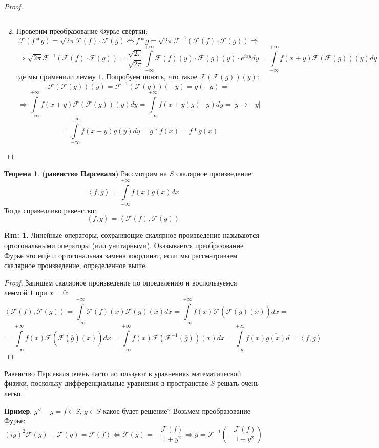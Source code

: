 \documentclass[12pt]{article}
\theoremstyle{definition}
\newtheorem{rem}{Rm:}
\newtheorem{theorem}{Теорема}
\newcommand{\ddint}[2]{\displaystyle\int\limits_{#1}^{#2}}
\newcommand{\inner}[2]{\left\langle #1, #2 \right\rangle }
\newcommand{\fourt}[1]{\mathcal{F}\left(#1\right)}
\newcommand{\ifourt}[1]{\mathcal{F}^{-1}\left(#1\right)}
\begin{document}
\begin{proof}
\begin{enumerate}[label=\arabic*)]
$$		$$
		\item Проверим преобразование Фурье свёртки:
		$$
			\fourt{f*g} = \sqrt{2\pi}\fourt{f}{\cdot}\fourt{g} \Leftrightarrow  f*g = \sqrt{2\pi}\ifourt{\fourt{f}{\cdot}\fourt{g}} \Rightarrow
		$$
		$$
			\Rightarrow \sqrt{2\pi}\ifourt{\fourt{f}{\cdot}\fourt{g}} = \dfrac{\sqrt{2\pi}}{\sqrt{2\pi}}\ddint{-\infty}{+\infty}\fourt{f}(y){\cdot}\fourt{g}(y){\cdot}e^{ixy}dy  = \ddint{-\infty}{+\infty}f(x + y) \fourt{\fourt{g}}(y)dy
		$$
		где мы применили лемму $1$. Попробуем понять, что такое $\fourt{\fourt{g}}(y)$:
		$$
			\fourt{\fourt{g}}(y) = \ifourt{\fourt{g}}(-y) = g(-y) \Rightarrow
		$$
		$$
			\Rightarrow \ddint{-\infty}{+\infty}f(x + y) \fourt{\fourt{g}}(y)dy = \ddint{-\infty}{+\infty}f(x + y)g(-y)dy = |y \to -y| 
		$$
		$$
			= \ddint{-\infty}{+\infty}f(x - y) g(y)dy = g*f(x) = f*g(x)
		$$
	\end{enumerate}
\end{proof}

\begin{theorem}(\textbf{равенство Парсеваля})
	Рассмотрим на $S$ скалярное произведение:
	$$
		\inner{f}{g} = \ddint{-\infty}{+\infty}f(x)\overline{g(x)}dx
	$$
	Тогда справедливо равенство: 
	$$
		\inner{f}{g} = \inner{\fourt{f}}{\fourt{g}}
	$$
\end{theorem}
\begin{rem}
	Линейные операторы, сохраняющие скалярное произведение называются ортогональными операторы (или унитарными). Оказывается преобразование Фурье это ещё и ортогональная замена координат, если мы рассматриваем скалярное произведение, определенное выше.
\end{rem}
\begin{proof}
	Запишем скалярное произведение по определению и воспользуемся леммой $1$ при $x = 0$:
	$$
		\inner{\fourt{f}}{\fourt{g}} = \ddint{-\infty}{+\infty}\fourt{f}(x)\overline{\fourt{g}(x)}dx = \ddint{-\infty}{+\infty}f(x)\fourt{\overline{\fourt{g}(x)}}dx = 
	$$
	$$
		= \ddint{-\infty}{+\infty}f(x)\fourt{\overline{\fourt{\overline{\overline{g}}}(x)}}dx = \ddint{-\infty}{+\infty}f(x)\fourt{\ifourt{\overline{g}}}(x)dx = \ddint{-\infty}{+\infty}f(x)\overline{g(x)}d = \inner{f}{g}
	$$
\end{proof}

Равенство Парсеваля очень часто используют в уравнениях математической физики, поскольку дифференциальные уравнения в пространстве $S$ решать очень легко.

\textbf{Пример}: $g'' - g = f \in S, \, g \in S$ какое будет решение? Возьмем преобразование Фурье:
$$
	(iy)^2\fourt{g} - \fourt{g} = \fourt{f} \Leftrightarrow \fourt{g} = - \dfrac{\fourt{f}}{1 + y^2} \Rightarrow  g = \ifourt{- \dfrac{\fourt{f}}{1 + y^2}}
$$
\end{document}
